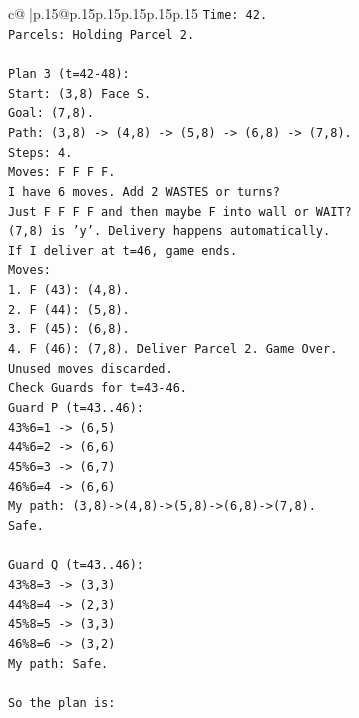 \documentclass{article}
\begin{document}
{\begin{supertabular}{c@{$\;$}|p{.15\linewidth}@{}p{.15\linewidth}p{.15\linewidth}p{.15\linewidth}p{.15\linewidth}p{.15\linewidth}}
{{{\texttt{Time: 42.} \\
\texttt{Parcels: Holding Parcel 2.} \\
\\ 
\texttt{Plan 3 (t=42{-}48):} \\
\texttt{Start: (3,8) Face S.} \\
\texttt{Goal: (7,8).} \\
\texttt{Path: (3,8) {-}> (4,8) {-}> (5,8) {-}> (6,8) {-}> (7,8).} \\
\texttt{Steps: 4.} \\
\texttt{Moves: F F F F.} \\
\texttt{I have 6 moves. Add 2 WASTES or turns?} \\
\texttt{Just F F F F and then maybe F into wall or WAIT?} \\
\texttt{(7,8) is 'y'. Delivery happens automatically.} \\
\texttt{If I deliver at t=46, game ends.} \\
\texttt{Moves:} \\
\texttt{1. F (43): (4,8).} \\
\texttt{2. F (44): (5,8).} \\
\texttt{3. F (45): (6,8).} \\
\texttt{4. F (46): (7,8). Deliver Parcel 2. Game Over.} \\
\texttt{Unused moves discarded.} \\
\texttt{Check Guards for t=43{-}46.} \\
\texttt{Guard P (t=43..46):} \\
\texttt{43\%6=1 {-}> (6,5)} \\
\texttt{44\%6=2 {-}> (6,6)} \\
\texttt{45\%6=3 {-}> (6,7)} \\
\texttt{46\%6=4 {-}> (6,6)} \\
\texttt{My path: (3,8){-}>(4,8){-}>(5,8){-}>(6,8){-}>(7,8).} \\
\texttt{Safe.} \\
\\ 
\texttt{Guard Q (t=43..46):} \\
\texttt{43\%8=3 {-}> (3,3)} \\
\texttt{44\%8=4 {-}> (2,3)} \\
\texttt{45\%8=5 {-}> (3,3)} \\
\texttt{46\%8=6 {-}> (3,2)} \\
\texttt{My path: Safe.} \\
\\ 
\texttt{So the plan is:} \\
}}}
\end{supertabular}}
\end{document}
